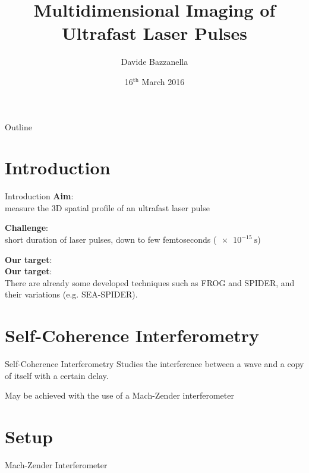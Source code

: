 \documentclass[11pt]{beamer}
\author{Davide Bazzanella}
\title{Multidimensional Imaging of Ultrafast Laser Pulses}
\institute{Imperial College London}
\date{16$^{\mathrm{th}}$ March 2016}
\begin{document}
\begin{frame}
\titlepage
\end{frame}

\begin{frame}{Outline}
\tableofcontents
\end{frame}

\section{Introduction}
\begin{frame}{Introduction}
\textbf{Aim}:\\
	measure the 3D spatial profile of an ultrafast laser pulse
	
	\vspace{15pt}
\textbf{Challenge}:\\
	short duration of laser pulses, down to few femtoseconds ($\SI{e-15}{\s}$)
\end{frame}

\begin{frame}

\textbf{Our target}:\\

\textbf{Our target}:\\
	
There are already some developed techniques such as FROG and SPIDER, and their variations (e.g. SEA-SPIDER).

\end{frame}

\section{Self-Coherence Interferometry}
\begin{frame}{Self-Coherence Interferometry}
Studies the interference between a wave and a copy of itself with a certain delay.

May be achieved with the use of a Mach-Zender interferometer
\end{frame}

\section{Setup}
\begin{frame}{Mach-Zender Interferometer}

\end{frame}
\end{document}
